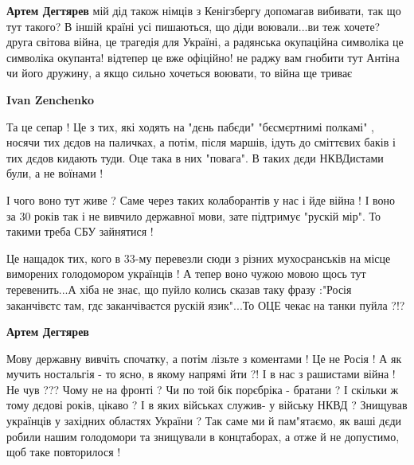 \begin{itemize}
\begin{itemize}
\begin{itemize}
 
\textbf{Артем Дегтярев} мій дід також німців з Кенігзбергу допомагав вибивати,
так що тут такого? В іншій країні усі пишаються, що діди воювали...ви теж
хочете? друга світова війна, це трагедія для Україні, а радянська окупаційна
символіка це символіка окупанта! відтепер це вже офіційно! не раджу вам гнобити
тут Антіна чи його дружину, а якщо сильно хочеться воювати, то війна ще триває

 
\textbf{Ivan Zenchenko} 

Та це сепар ! Це з тих, які ходять на "дєнь пабєди" "бєсмєртнимі полкамі" ,
носячи тих дєдов на паличках, а потім, після маршів, ідуть до сміттєвих баків і
тих дєдов кидають туди. Оце така в них "повага". В таких дєди НКВДистами були,
а не воїнами ! 

І чого воно тут живе ? Саме через таких колаборантів у нас і йде війна ! І воно
за 30 років так і не вивчило державної мови, зате підтримує "рускій мір". То
такими треба СБУ зайнятися ! 

Це нащадок тих, кого в 33-му перевезли сюди з різних мухосранськів на місце
виморених голодомором українців ! А тепер воно чужою мовою щось тут
теревенить...А хіба не знає, що пуйло колись сказав таку фразу :"Росія
заканчівєтс там, гдє заканчіваєтся рускій язик"...То ОЦЕ чекає на танки пуйла
?!?

 
\textbf{Артем Дегтярев} 

Мову державну вивчіть спочатку, а потім лізьте з коментами ! Це не Росія ! А як
мучить ностальгія - то ясно, в якому напрямі йти ?! І в нас з рашистами війна
!Не чув ??? Чому не на фронті ? Чи по той бік порєбріка - братани ? І скільки ж
тому дєдові років, цікаво ? І в яких військах служив- у війську НКВД ? Знищував
українців у західних областях України ? Так саме ми й пам"ятаємо, як ваші дєди
робили нашим голодомори та знищували в концтаборах, а отже й не допустимо, щоб
таке повторилося !


\end{itemize}
\end{itemize}
\end{itemize}
